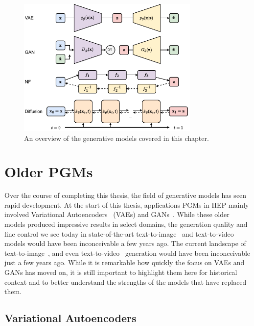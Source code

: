 \begin{figure}[ht]
    \centering
    \includegraphics[width=0.8\textwidth]{Figures/generative_models/pgms.pdf}
    \caption{An overview of the generative models covered in this chapter.}
    \label{fig:generative_models}
\end{figure}


\section{Older PGMs}

Over the course of completing this thesis, the field of generative models has seen rapid development.
At the start of this thesis, applications PGMs in HEP mainly involved Variational Autoencoders~\cite{AutoEncodingVariationalBayes} (VAEs) and GANs~\cite{GenerativeAdversarialNetworks}.
While these older models produced impressive results in select domains, the generation quality and fine control we see today in state-of-the-art text-to-image~\cite{SD3, Dalle, Imagen,flux2024github} and text-to-video~\cite{ImagenVideo} models would have been inconceivable a few years ago.
The current landscape of text-to-image~\cite{Imagen, Dalle, SD3}, and even text-to-video~\cite{ImagenVideo} generation would have been inconceivable just a few years ago.
While it is remarkable how quickly the focus on VAEs and GANs has moved on, it is still important to highlight them here for historical context and to better understand the strengths of the models that have replaced them.

\subsection{Variational Autoencoders}

